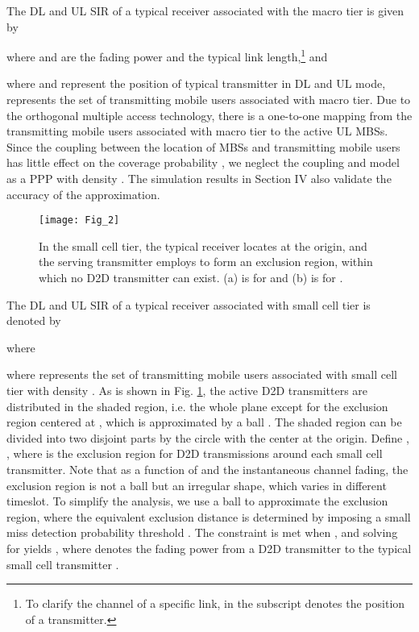\documentclass[twocolumn,english]{IEEEtran}
\theoremstyle{plain}
\theoremstyle{definition}
\begin{document}
The DL and UL SIR of a typical receiver associated with the macro
tier is given by

where  and  are the fading power and the typical link
length,\footnote{To clarify the channel of a specific link,  in the subscript denotes
the position of a transmitter.} and


where  and  represent the position of typical transmitter
in DL and UL mode,  represents
the set of transmitting mobile users associated with macro tier. Due
to the orthogonal multiple access technology, there is a one-to-one
mapping from the transmitting mobile users associated with macro tier
to the active UL MBSs. Since the coupling between the location of
MBSs and transmitting mobile users has little effect on the coverage
probability \cite{CHDD,AMUC}, we neglect the coupling and model 
as a PPP with density .
The simulation results in Section IV also validate the accuracy of
the approximation.

{\small{}}
\begin{figure}[t]
{\small{}\centering\texttt{[image: Fig\_2]}\protect\caption{{\small{}\label{fig:D2D_small cell}In the small cell tier, the typical
receiver locates at the origin, and the serving transmitter 
employs  to form an exclusion region, within
which no D2D transmitter can exist. (a) is for 
and (b) is for . }}
}
\end{figure}
{\small \par}

The DL and UL SIR of a typical receiver associated with small cell
tier is denoted by


where



where 
represents the set of transmitting mobile users associated with small
cell tier with density .
As is shown in Fig. \ref{fig:D2D_small cell}, the active D2D transmitters
are distributed in the shaded region, i.e. the whole 
plane except for the exclusion region centered at , which
is approximated by a ball . The shaded region can be
divided into two disjoint parts by the circle  with
the center at the origin. Define ,
,
where  is the exclusion region for D2D transmissions
around each small cell transmitter. Note that as a function of 
and the instantaneous channel fading, the exclusion region is not
a ball but an irregular shape, which varies in different timeslot.
To simplify the analysis, we use a ball to approximate the exclusion
region, where the equivalent exclusion distance is determined by imposing
a small miss detection probability threshold . The constraint
is met when ,
and solving for  yields \textbf{},
where  denotes the fading power from a D2D transmitter
 to the typical small cell transmitter .
\end{document}

